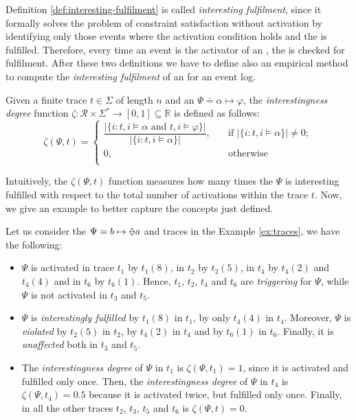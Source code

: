 Definition \ref{def:interesting-fulfilment} is called \textit{interesting fulfilment}, since it formally solves the problem of constraint satisfaction without activation by identifying only those events where the activation condition holds and the \rcon\xspace is fulfilled. Therefore, every time an event is the activator of an \rcon, the \rcon\xspace is checked for fulfilment.
After these two definitions we have to define also an empirical method to compute the \textit{interesting fulfilment} of an \rcon\xspace for an event log.

\begin{definition}\label{def:interestingness-degree}
Given a finite trace $t \in \Sigma$ of length $n$ and an \rcon\xspace $\Psi \doteq \alpha  \mapsto \varphi$, the \emph{interestingness degree} function $\zeta: \mathcal{R} \times \Sigma^* \rightarrow [0,1] \subseteq \mathbb{R}$ is defined as follows:
\[   
\zeta(\Psi,t) = 
     \begin{cases}
       \dfrac{\lvert \{ i: t,i \models \alpha \text{ and } t,i \models \varphi\} \rvert}{\lvert \{ i: t,i \models \alpha\} \rvert}, &\quad\text{if } \lvert \{ i: t,i \models \alpha\} \rvert \neq 0 ;\\
       0, &\quad\text{otherwise} \\
     \end{cases}
\]
\end{definition}
Intuitively, the $\zeta(\Psi, t)$ function measures how many times the \rcon\xspace $\Psi$ is interesting fulfilled with respect to the total number of activations within the trace $t$. Now, we give an example to better capture the concepts just defined.

\begin{example}\label{ex:janus-interest}
Let us consider the \rcon\xspace $\Psi = b \mapsto \Once a$ and traces in the Example \ref{ex:traces}, we have the following:
\begin{itemize}
\item $\Psi$ is activated in trace $t_1$ by $t_1(8)$, in $t_2$ by $t_2(5)$, in $t_4$ by $t_4(2)$ and $t_4(4)$ and in $t_6$ by $t_6(1)$. Hence, $t_1$, $t_2$, $t_4$ and $t_6$ are \textit{triggering} for $\Psi$, while $\Psi$ is not activated in $t_3$ and $t_5$.
\item $\Psi$ is \textit{interestingly fulfilled} by $t_1(8)$ in $t_1$, by only $t_4(4)$ in $t_4$. Moreover, $\Psi$ is \textit{violated} by $t_2(5)$ in $t_2$, by $t_4(2)$ in $t_4$ and by $t_6(1)$ in $t_6$. Finally, it is \textit{unaffected} both in $t_3$ and $t_5$. 
\item The \textit{interestingness degree} of $\Psi$ in $t_1$ is $\zeta(\Psi, t_1) = 1$, since it is activated and fulfilled only once. Then, the \textit{interestingness degree} of $\Psi$ in $t_4$ is $\zeta(\Psi, t_4) = 0.5$ because it is activated twice, but fulfilled only once. Finally, in all the other traces $t_2$, $t_3$, $t_5$ and $t_6$ is $\zeta(\Psi, t) = 0$.
\end{itemize}
\end{example}

